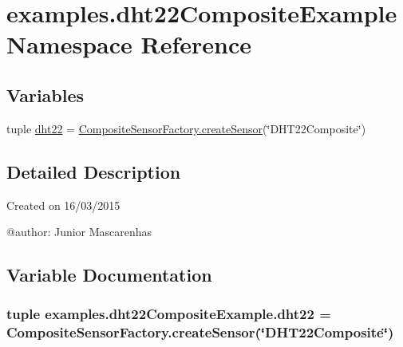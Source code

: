 \hypertarget{namespaceexamples_1_1dht22CompositeExample}{}\section{examples.\+dht22\+Composite\+Example Namespace Reference}
\label{namespaceexamples_1_1dht22CompositeExample}
\subsection*{Variables}
\begin{DoxyCompactItemize}
\item 
tuple \hyperlink{namespaceexamples_1_1dht22CompositeExample_a1c6e3a4c9e037e30d50b361ed4dd926f}{dht22} = \hyperlink{classconcretefactory_1_1compositeSensorFactory_1_1CompositeSensorFactory_a2d3860525907a2f2d37c98163150ea03}{Composite\+Sensor\+Factory.\+create\+Sensor}(\char`\"{}D\+H\+T22\+Composite\char`\"{})
\end{DoxyCompactItemize}


\subsection{Detailed Description}
\begin{DoxyVerb}Created on 16/03/2015

@author: Junior Mascarenhas
\end{DoxyVerb}
 

\subsection{Variable Documentation}
\hypertarget{namespaceexamples_1_1dht22CompositeExample_a1c6e3a4c9e037e30d50b361ed4dd926f}{}
\subsubsection[{dht22}]{\setlength{\rightskip}{0pt plus 5cm}tuple examples.\+dht22\+Composite\+Example.\+dht22 = {\bf Composite\+Sensor\+Factory.\+create\+Sensor}(\char`\"{}D\+H\+T22\+Composite\char`\"{})}\label{namespaceexamples_1_1dht22CompositeExample_a1c6e3a4c9e037e30d50b361ed4dd926f}
